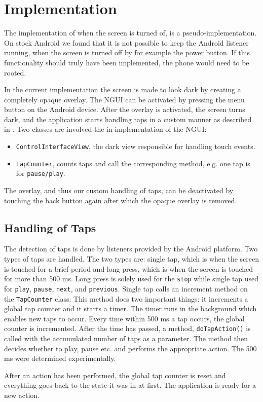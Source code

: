 \section{Implementation}
The implementation of when the screen is turned of, is a pseudo-implementation. On stock Android we found that it is not possible to keep the Android listener running, when the screen is turned off by for example the power button. If this functionality should truly have been implemented, the phone would need to be rooted. 

In the current implementation the screen is made to look dark by creating a completely opaque overlay. The NGUI can be activated by pressing the menu button on the Android device. After the overlay is activated, the screen turns dark, and the application starts handling taps in a custom
manner as described in . Two classes are involved the in implementation of the NGUI: 
\begin{itemize}
\item \texttt{ControlInterfaceView}, the dark view responsible for handling touch events.
\item \texttt{TapCounter}, counts taps and call the corresponding method, e.g. one tap is for \texttt{pause/play}.
\end{itemize}


The overlay, and thus our custom handling of taps, can be deactivated by touching the back button again after which the opaque overlay is removed.

\subsection{Handling of Taps}\label{subsec:handleTaps}
The detection of taps is done by listeners provided by the Android platform. Two types of taps are handled. The two types are: single tap, which is when the screen is touched for a brief period and long press, which is when the screen is touched for more than 500 ms. Long press is solely used for the \texttt{stop} while single tap used for \texttt{play}, \texttt{pause}, \texttt{next}, and \texttt{previous}. Single tap calls an increment method on the \texttt{TapCounter} class.
This method does two important things: it increments a global tap counter and it starts a timer. The timer runs in the background which enables new taps to occur. Every time within 500 ms a tap occurs, the global counter is incremented. After the time has passed, a method, \texttt{doTapAction()} is called with the accumulated number of taps as a parameter. The method then decides whether to play, pause etc. and performs the appropriate action. The 500 ms were determined experimentally.

After an action has been performed, the global tap counter is reset and everything goes back to the state it was in at first. The application is ready for a new action.